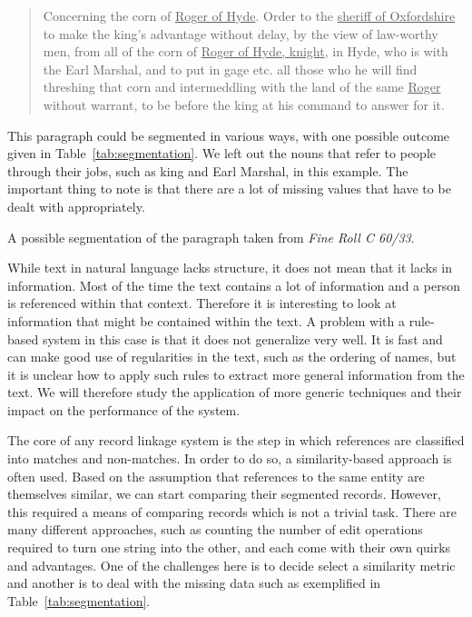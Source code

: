 \begin{quote}
	Concerning the corn of \ul{Roger of Hyde}. Order to the \ul{sheriff of Oxfordshire} to make the king’s advantage without delay, by the view of law-worthy men, from all of the corn of \ul{Roger of Hyde, knight}, in Hyde, who is with the Earl Marshal, and to put in gage etc. all those who he will find threshing that corn and intermeddling with the land of the same \ul{Roger} without warrant, to be before the king at his command to answer for it.
\end{quote}

\noindent This paragraph could be segmented in various ways, with one possible outcome given in Table~\ref{tab:segmentation}.
We left out the nouns that refer to people through their jobs, such as king and Earl Marshal, in this example.
The important thing to note is that there are a lot of missing values that have to be dealt with appropriately.

\begin{table}
	\centering
	
	\caption{A possible segmentation of the paragraph taken from \emph{Fine Roll C 60/33}.}
	\label{tab:segmentation}
\end{table}

While text in natural language lacks structure, it does not mean that it lacks in information.
Most of the time the text contains a lot of information and a person is referenced within that context.
Therefore it is interesting to look at information that might be contained within the text.
A problem with a rule-based system in this case is that it does not generalize very well.
It is fast and can make good use of regularities in the text, such as the ordering of names, but it is unclear how to apply such rules to extract more general information from the text.
We will therefore study the application of more generic techniques and their impact on the performance of the system.

The core of any record linkage system is the step in which references are classified into matches and non-matches.
In order to do so, a similarity-based approach is often used.
Based on the assumption that references to the same entity are themselves similar, we can start comparing their segmented records.
However, this required a means of comparing records which is not a trivial task.
There are many different approaches, such as counting the number of edit operations required to turn one string into the other, and each come with their own quirks and advantages.
One of the challenges here is to decide select a similarity metric and another is to deal with the missing data such as exemplified in Table~\ref{tab:segmentation}.

